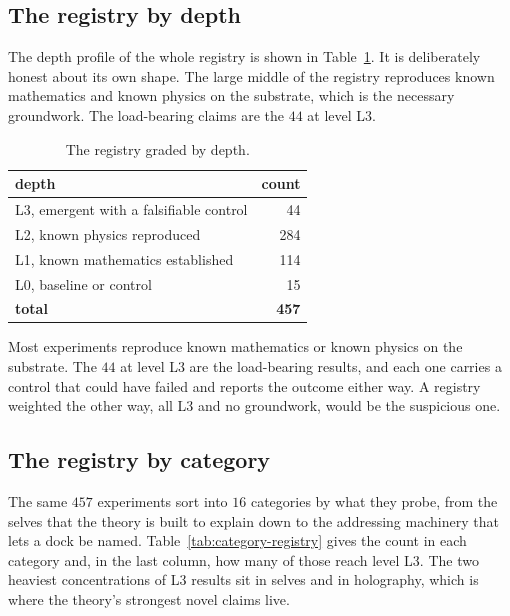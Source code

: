 \subsection{The registry by depth}

The depth profile of the whole registry is shown in Table~\ref{tab:depth-registry}. It is deliberately honest about its own shape. The large middle of the registry reproduces known mathematics and known physics on the substrate, which is the necessary groundwork. The load-bearing claims are the $44$ at level L3.

\begin{table}[ht]
\centering
\begin{tabular}{@{}lr@{}}
\toprule
depth & count \\
\midrule
L3, emergent with a falsifiable control & 44 \\
L2, known physics reproduced & 284 \\
L1, known mathematics established & 114 \\
L0, baseline or control & 15 \\
\midrule
\textbf{total} & \textbf{457} \\
\bottomrule
\end{tabular}
\caption{The registry graded by depth.}
\label{tab:depth-registry}
\end{table}

\begin{principle}
Most experiments reproduce known mathematics or known physics on the substrate. The $44$ at level L3 are the load-bearing results, and each one carries a control that could have failed and reports the outcome either way. A registry weighted the other way, all L3 and no groundwork, would be the suspicious one.
\end{principle}

\subsection{The registry by category}

The same $457$ experiments sort into $16$ categories by what they probe, from the selves that the theory is built to explain down to the addressing machinery that lets a dock be named. Table~\ref{tab:category-registry} gives the count in each category and, in the last column, how many of those reach level L3. The two heaviest concentrations of L3 results sit in selves and in holography, which is where the theory's strongest novel claims live.

